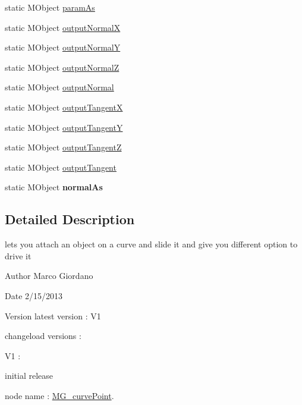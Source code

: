 \begin{DoxyCompactItemize}
\item 
static M\-Object \hyperlink{class_m_g__curve_point_a6e9c40cd444c7b9a33d8f5bc8535284d}{param\-As}
\item 
static M\-Object \hyperlink{class_m_g__curve_point_a44ac5cdd311c5faffc2c90664fefaa45}{output\-Normal\-X}
\item 
static M\-Object \hyperlink{class_m_g__curve_point_a75140198bea8fe10ce577d57c0067e85}{output\-Normal\-Y}
\item 
static M\-Object \hyperlink{class_m_g__curve_point_ac0f7c2a5502c30630edd5ab570271704}{output\-Normal\-Z}
\item 
static M\-Object \hyperlink{class_m_g__curve_point_a6651bf21d34437f6920d5c31eba5e466}{output\-Normal}
\item 
static M\-Object \hyperlink{class_m_g__curve_point_ad9c8e30200127bfb68e48752058d7620}{output\-Tangent\-X}
\item 
static M\-Object \hyperlink{class_m_g__curve_point_ae54be9fde6c16833d50760fd4969a86d}{output\-Tangent\-Y}
\item 
static M\-Object \hyperlink{class_m_g__curve_point_a898c4d8f7dec9296950b06562a8831b2}{output\-Tangent\-Z}
\item 
static M\-Object \hyperlink{class_m_g__curve_point_a1025b953df44e00d1d276ea29e7eab23}{output\-Tangent}
\item 
\hypertarget{class_m_g__curve_point_abd24fb7e6e5706c463ef68fd8e268e16}{static M\-Object {\bfseries normal\-As}}\label{class_m_g__curve_point_abd24fb7e6e5706c463ef68fd8e268e16}

\end{DoxyCompactItemize}


\subsection{Detailed Description}
lets you attach an object on a curve and slide it and give you different option to drive it 

\begin{DoxyAuthor}{Author}
Marco Giordano 
\end{DoxyAuthor}
\begin{DoxyDate}{Date}
2/15/2013 
\end{DoxyDate}
\begin{DoxyVersion}{Version}
latest version \-: V1 

changeload versions \-: \par
 V1 \-: \par

\begin{DoxyItemize}
\item initial release \par

\end{DoxyItemize}
\end{DoxyVersion}
node name \-: \hyperlink{class_m_g__curve_point}{M\-G\-\_\-curve\-Point}.

